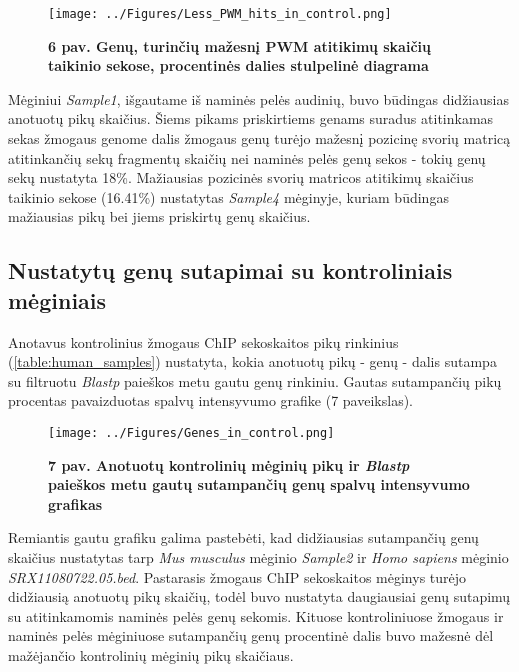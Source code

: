 \documentclass[12pt]{article}
\begin{document}
\begin{figure}[ht]
    \begin{center}
        \captionsetup{justification=centering}
        \texttt{[image: ../Figures/Less\_PWM\_hits\_in\_control.png]}
        \vspace{-1.5\baselineskip}
        \caption*{\small\textbf{6 pav. Genų, turinčių mažesnį PWM atitikimų 
                                skaičių taikinio sekose, procentinės dalies
                                stulpelinė diagrama}}
    \end{center}
\end{figure}

Mėginiui \emph{Sample1}, išgautame iš naminės pelės audinių, buvo būdingas
didžiausias anotuotų pikų skaičius. Šiems pikams priskirtiems genams suradus
atitinkamas sekas žmogaus genome dalis žmogaus genų turėjo
mažesnį pozicinę svorių matricą atitinkančių sekų fragmentų skaičių nei
naminės pelės genų sekos - tokių genų sekų nustatyta 18\%. Mažiausias pozicinės
svorių matricos atitikimų skaičius taikinio sekose (16.41\%) nustatytas
\emph{Sample4} mėginyje, kuriam būdingas mažiausias pikų bei jiems priskirtų
genų skaičius.

\newpage

\subsection*{Nustatytų genų sutapimai su kontroliniais mėginiais}
Anotavus kontrolinius žmogaus ChIP sekoskaitos pikų rinkinius
(\ref{table:human_samples}) nustatyta, kokia anotuotų pikų - genų - dalis
sutampa su filtruotu \emph{Blastp} paieškos metu gautu genų rinkiniu. Gautas
sutampančių pikų procentas pavaizduotas spalvų intensyvumo grafike
(7 paveikslas).

\begin{figure}[ht]
    \begin{center}
        \captionsetup{justification=centering}
        \texttt{[image: ../Figures/Genes\_in\_control.png]}
        \vspace{-1.5\baselineskip}
        \caption*{\small\textbf{7 pav. Anotuotų kontrolinių mėginių pikų ir
                                \emph{Blastp} paieškos metu gautų sutampančių
                                genų spalvų intensyvumo grafikas}}
    \end{center}
\end{figure}

Remiantis gautu grafiku galima pastebėti, kad didžiausias sutampančių genų
skaičius nus\-ta\-ty\-tas tarp \emph{Mus musculus} mėginio \emph{Sample2} ir
\emph{Homo sapiens} mėginio \emph{SRX11080722.05.bed}. Pas\-ta\-ra\-sis žmogaus
ChIP sekoskaitos mėginys turėjo didžiausią anotuotų pikų skaičių, todėl 
buvo nustatyta daugiausiai genų sutapimų su atitinkamomis naminės pelės genų
sekomis. Kituose kontroliniuose žmogaus ir naminės pelės mėginiuose sutampančių
genų procentinė dalis buvo mažesnė dėl mažėjančio kontrolinių mėginių pikų
skaičiaus.
\end{document}
